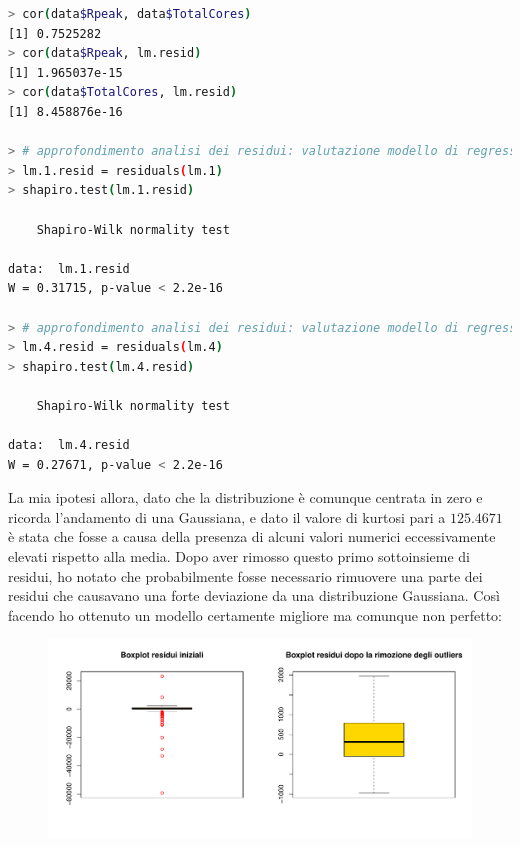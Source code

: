 \documentclass[11pt,a4paper]{article}
\begin{document}
\begin{lstlisting}[language=bash,basicstyle=\tiny,tabsize=2,frame = single]
> cor(data$Rpeak, data$TotalCores)
[1] 0.7525282
> cor(data$Rpeak, lm.resid)
[1] 1.965037e-15
> cor(data$TotalCores, lm.resid)
[1] 8.458876e-16

> # approfondimento analisi dei residui: valutazione modello di regressione lineare con tutti i fattori
> lm.1.resid = residuals(lm.1)
> shapiro.test(lm.1.resid)

	Shapiro-Wilk normality test

data:  lm.1.resid
W = 0.31715, p-value < 2.2e-16

> # approfondimento analisi dei residui: valutazione modello di regressione lineare semplice
> lm.4.resid = residuals(lm.4)
> shapiro.test(lm.4.resid)

	Shapiro-Wilk normality test

data:  lm.4.resid
W = 0.27671, p-value < 2.2e-16
\end{lstlisting}
\vspace{0.2cm}
La mia ipotesi allora, dato che la distribuzione \`e comunque centrata in zero e
ricorda l'andamento di una Gaussiana, e dato il valore di kurtosi pari a
$125.4671$ \`e stata che fosse a causa della presenza di alcuni valori numerici
eccessivamente elevati rispetto alla media. Dopo aver rimosso questo primo
sottoinsieme di residui, ho notato che probabilmente fosse necessario rimuovere
una parte dei residui che causavano una forte deviazione da una distribuzione
Gaussiana. Cos\`i facendo ho ottenuto un modello certamente migliore ma
comunque non perfetto:
\clearpage
\begin{figure}[H]
	\vspace{-1cm}
	\begin{center}
		\hspace*{-1.5cm}
		\includegraphics[scale=0.7]{imgs/residuals_boxplots.pdf}
	\end{center}
\end{figure}
\end{document}
